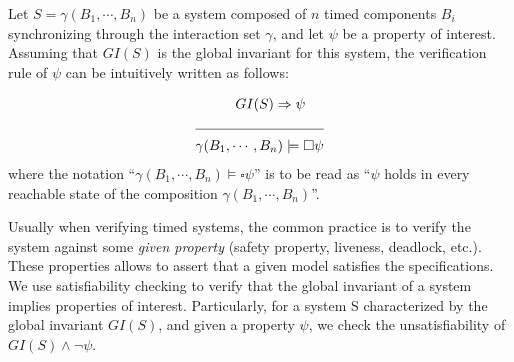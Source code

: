 
Let $S=\gamma(B_1,\cdots,B_n)$ be a system composed of $n$ timed components $B_i$ 
synchronizing through the interaction 
set $\gamma$, and let $\psi$ be a property of interest. Assuming that 
$GI(S)$ is the global invariant for this system, 
the verification rule of $\psi$ can be intuitively
written as follows:

\begin{align*}
  &\hspace{1cm}GI(S)\Rightarrow\psi\\
    \cline{1-2}
   &\gamma(B_1,\cdots,B_n)\models\square\psi
\end{align*}
where the notation \enquote{$\gamma(B_1,\cdots,B_n)\models\square\psi$} is to 
be read as \enquote{$\psi$ holds in every reachable state of the
composition $\gamma(B_1,\cdots,B_n)$}.

Usually when verifying timed systems, the common practice is to verify the system 
against some \emph{given property} (safety property, liveness, deadlock, etc.).
These properties allows to assert that a given model satisfies the specifications.
We use satisfiability checking to verify that the global 
invariant of a system 
implies properties of interest. Particularly, for a system S characterized 
by the global invariant $GI(S)$, and 
given a property $\psi$, we check the unsatisfiability of 
$GI(S)\wedge\neg\psi$. 



